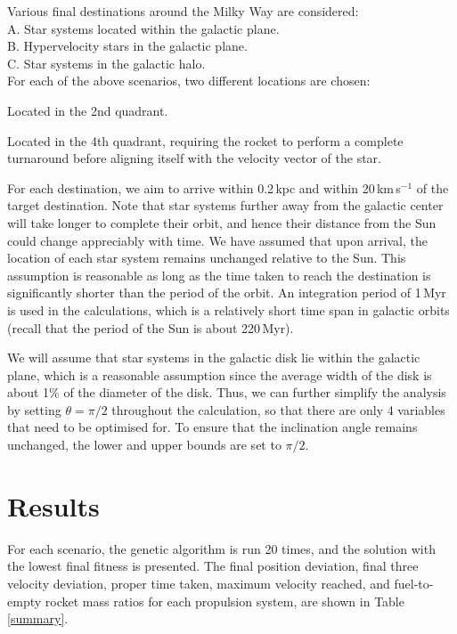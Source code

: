 \documentclass[review]{elsarticle}
\begin{document}
Various final destinations around the Milky Way are considered:\\[0.3cm]
\indent A. Star systems located within the galactic plane.\\[0.1cm]
\indent B. Hypervelocity stars in the galactic plane.\\[0.1cm]
\indent C. Star systems in the galactic halo.\\

For each of the above scenarios, two different locations are chosen:
\begin{enumerate*}
\item Located in the 2nd quadrant.
\item Located in the 4th quadrant, requiring the rocket to perform a complete turnaround before aligning itself with the velocity vector of the star.  
\end{enumerate*} 

For each destination, we aim to arrive within 0.2\,kpc and within 20\,km\,s$^{-1}$ of the target destination. Note that star systems further away from the galactic center will take longer to complete their orbit, and hence their distance from the Sun could change appreciably with time. We have assumed that upon arrival, the location of each star system remains unchanged relative to the Sun. This assumption is reasonable as long as the time taken to reach the destination is significantly shorter than the period of the orbit. An integration period of 1\,Myr is used in the calculations, which is a relatively short time span in galactic orbits (recall that the period of the Sun is about 220\,Myr).

We will assume that star systems in the galactic disk lie within the galactic plane, which is a reasonable assumption since the average width of the disk is about 1\% of the diameter of the disk. Thus, we can further simplify the analysis by setting $\theta=\pi/2$ throughout the calculation, so that there are only 4 variables that need to be optimised for. To ensure that the inclination angle remains unchanged, the lower and upper bounds are set to $\pi/2$.

\section{Results}
For each scenario, the genetic algorithm is run 20 times, and the solution with the lowest final fitness is presented. The final position deviation, final three velocity deviation, proper time taken, maximum velocity reached, and fuel-to-empty rocket mass ratios for each propulsion system, are shown in Table \ref{summary}.
\end{document}
